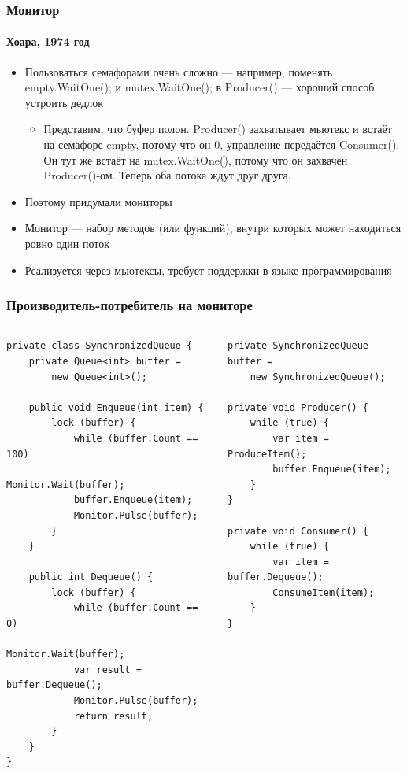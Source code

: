 \documentclass[xetex,mathserif,serif]{beamer}
\begin{document}
	\begin{frame}
		\frametitle{Монитор}
		\framesubtitle{Хоара, 1974 год}
		\begin{itemize}
			\item Пользоваться семафорами очень сложно --- например, поменять empty.WaitOne(); и mutex.WaitOne(); в Producer() --- хороший способ устроить дедлок
			\begin{itemize}
				\item Представим, что буфер полон. Producer() захватывает мьютекс и встаёт на семафоре empty, потому что он 0, управление передаётся Consumer(). Он тут же встаёт на mutex.WaitOne(), потому что он захвачен Producer()-ом. Теперь оба потока ждут друг друга.
			\end{itemize}
			\item Поэтому придумали мониторы
			\item Монитор --- набор методов (или функций), внутри которых может находиться ровно один поток
			\item Реализуется через мьютексы, требует поддержки в языке программирования
		\end{itemize}
	\end{frame}

	\begin{frame}[fragile]
		\frametitle{Производитель-потребитель на мониторе}
		\begin{scriptsize}
			\begin{columns}
				\begin{column}{0.5\textwidth}
					\begin{verbatim}
private class SynchronizedQueue {
    private Queue<int> buffer = 
        new Queue<int>();

    public void Enqueue(int item) {
        lock (buffer) {
            while (buffer.Count == 100)
                Monitor.Wait(buffer);
            buffer.Enqueue(item);
            Monitor.Pulse(buffer);
        }
    }

    public int Dequeue() {
        lock (buffer) {
            while (buffer.Count == 0)
                Monitor.Wait(buffer);
            var result = buffer.Dequeue();
            Monitor.Pulse(buffer);
            return result;
        }
    }
}
					\end{verbatim}
				\end{column}
				\begin{column}{0.5\textwidth}
					\begin{verbatim}
private SynchronizedQueue buffer = 
    new SynchronizedQueue();

private void Producer() {
    while (true) {
        var item = ProduceItem();
        buffer.Enqueue(item);
    }
}

private void Consumer() {
    while (true) {
        var item = buffer.Dequeue();
        ConsumeItem(item);
    }
}
					\end{verbatim}
				\end{column}
			\end{columns}
		\end{scriptsize}
	\end{frame}
\end{document}
